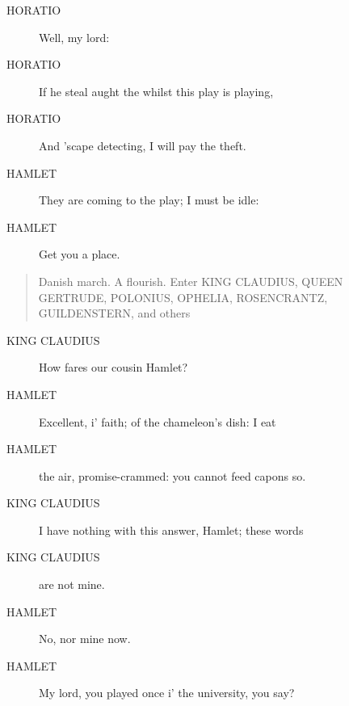 \documentclass{article}
\begin{document}
\begin{description}
            
\item[HORATIO] Well, my lord:
\item[HORATIO] If he steal aught the whilst this play is playing,
\item[HORATIO] And 'scape detecting, I will pay the theft.
\end{description}
          
\begin{description}
            
\item[HAMLET] They are coming to the play; I must be idle:
\item[HAMLET] Get you a place.
\end{description}
          
\begin{quote}
Danish march. A flourish. Enter KING CLAUDIUS,
QUEEN GERTRUDE, POLONIUS, OPHELIA, ROSENCRANTZ,
GUILDENSTERN, and others
\end{quote}
          
\begin{description}
            
\item[KING CLAUDIUS] How fares our cousin Hamlet?
\end{description}
          
\begin{description}
            
\item[HAMLET] Excellent, i' faith; of the chameleon's dish: I eat
\item[HAMLET] the air, promise-crammed: you cannot feed capons so.
\end{description}
          
\begin{description}
            
\item[KING CLAUDIUS] I have nothing with this answer, Hamlet; these words
\item[KING CLAUDIUS] are not mine.
\end{description}
          
\begin{description}
            
\item[HAMLET] No, nor mine now.
\item[HAMLET] My lord, you played once i' the university, you say?
\end{description}
          
\end{document}
